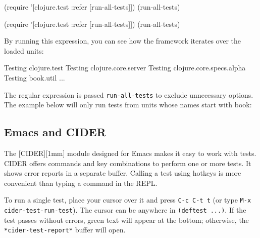 \ifnarrow

\begin{english}
  \begin{clojure}
(require
  '[clojure.test :refer [run-all-tests]])
(run-all-tests)
  \end{clojure}
\end{english}

\else

\begin{english}
  \begin{clojure}
(require '[clojure.test :refer [run-all-tests]])
(run-all-tests)
  \end{clojure}
\end{english}

\fi

By running this expression, you can see how the framework iterates over the loaded units:

\begin{english}
  \begin{text}
Testing clojure.test
Testing clojure.core.server
Testing clojure.core.specs.alpha
Testing book.util
...
  \end{text}
\end{english}


The regular expression is passed \verb|run-all-tests| to exclude unnecessary options. The example below will only run tests from units whose names start with book:

\begin{english}
\end{english}

\subsection{Emacs and CIDER}


The [CIDER][1mm] module designed for Emacs makes it easy to work with tests. CIDER offers commands and key combinations to perform one or more tests. It shows error reports in a separate buffer. Calling a test using hotkeys is more convenient than typing a command in the REPL.

To run a single test, place your cursor over it and press \verb|C-c C-t t| (or type \verb|M-x cider-test-run-test|). The cursor can be anywhere in \verb|(deftest ...)|. If the test passes without errors, green text will appear at the bottom; otherwise, the \verb|*cider-test-report*| buffer will open.

